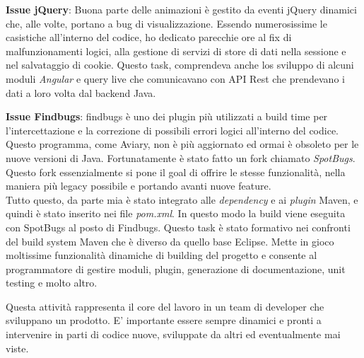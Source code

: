 \documentclass[a4paper]{article}
\begin{document}
\par \textbf{Issue jQuery}: Buona parte delle animazioni è gestito da eventi jQuery 
dinamici che, alle volte, portano a bug di visualizzazione. Essendo numerosissime
le casistiche all'interno del codice, ho dedicato parecchie ore al fix di malfunzionamenti
logici, alla gestione di servizi di store di dati nella sessione e nel salvataggio di cookie.
Questo task, comprendeva anche los sviluppo di alcuni moduli \emph{Angular} e query live
che comunicavano con API Rest che prendevano i dati a loro volta dal backend Java.\\
\par \textbf{Issue Findbugs}: findbugs è uno dei plugin più utilizzati a build time 
per l'intercettazione e la correzione di possibili errori logici all'interno del codice.
Questo programma, come Aviary, non è più aggiornato ed ormai è obsoleto per le nuove
versioni di Java. Fortunatamente è stato fatto un fork chiamato \emph{SpotBugs}.
Questo fork essenzialmente si pone il goal di offrire le stesse funzionalità, nella
maniera più legacy possibile e portando avanti nuove feature.\\
Tutto questo, da parte mia è stato integrato alle \emph{dependency} e ai \emph{plugin}
Maven, e quindi è stato inserito nei file \emph{pom.xml}. In questo modo la build viene
eseguita con SpotBugs al posto di Findbugs. Questo task è stato formativo nei confronti
del build system Maven che è diverso da quello base Eclipse. Mette in gioco moltissime
funzionalità dinamiche di building del progetto e consente al programmatore di gestire
moduli, plugin, generazione di documentazione, unit testing e molto altro.
\par Questa attività rappresenta il core del lavoro in un team di developer che sviluppano
un prodotto. E' importante essere sempre dinamici e pronti a intervenire in parti di codice
nuove, sviluppate da altri ed eventualmente mai viste.
\newpage
\end{document}
